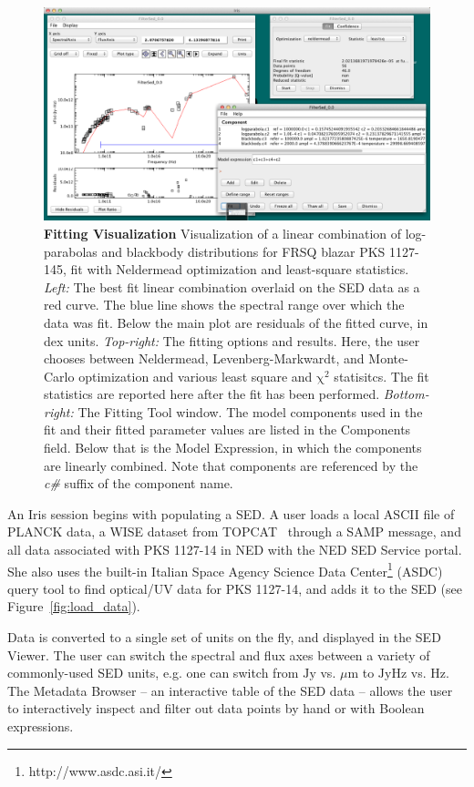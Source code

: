 \documentclass[final,5p]{elsarticle}
\begin{document}
\begin{figure}
\centering
\includegraphics[height=0.3\textheight]{figures/fitting-1.png}
\caption{\textbf{Fitting Visualization} Visualization of a linear combination of log-parabolas and blackbody distributions for FRSQ blazar PKS 1127-145, fit with Neldermead optimization and least-square statistics. \textit{Left:} The best fit linear combination overlaid on the SED data as a red curve. The blue line shows the spectral range over which the data was fit. Below the main plot are residuals of the fitted curve, in dex units. \textit{Top-right:} The fitting options and results. Here, the user chooses between Neldermead, Levenberg-Markwardt, and Monte-Carlo optimization and various least square and $\mathrm{\chi}^{2}$ statisitcs. The fit statistics are reported here after the fit has been performed. \textit{Bottom-right:} The Fitting Tool window. The model components used in the fit and their fitted parameter values are listed in the Components field. Below that is the Model Expression, in which the components are linearly combined. Note that components are referenced by the \textit{c\#} suffix of the component name.}
\label{fig:fitting1}
\end{figure}

An Iris session begins with populating a SED. A user loads a local ASCII file of PLANCK data, a WISE dataset from TOPCAT~\citep{2005ASPC..347...29T} through a SAMP message, and all data associated with PKS 1127-14 in NED with the NED SED Service portal. She also uses the built-in Italian Space Agency Science Data Center\footnote{http://www.asdc.asi.it/} (ASDC) query tool to find optical/UV data for PKS 1127-14, and adds it to the SED (see Figure~\ref{fig:load_data}).

Data is converted to a single set of units on the fly, and displayed in the SED Viewer. The user can switch the spectral and flux axes between a variety of commonly-used SED units, e.g. one can switch from $\mathrm{Jy}$ vs. ${\mu}\mathrm{m}$ to $\mathrm{Jy}\mathrm{Hz}$ vs. $\mathrm{Hz}$. The Metadata Browser -- an interactive table of the SED data -- allows the user to interactively inspect and filter out data points by hand or with Boolean expressions.
\end{document}
